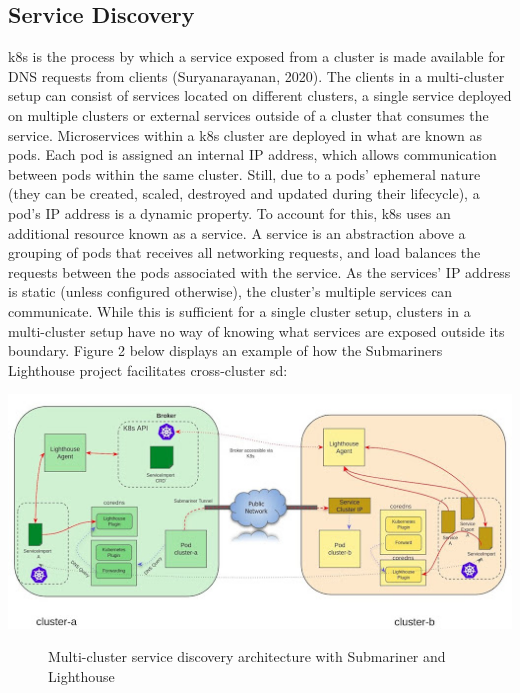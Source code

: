 \documentclass[12pt, a4paper, oneside]{article}
\begin{document}
\subsection{Service Discovery}
\acrshort{k8s} is the process by which a service exposed from a cluster is made available for DNS requests from clients (Suryanarayanan, 2020). The clients in a multi-cluster setup can consist of services located on different clusters, a single service deployed on multiple clusters or external services outside of a cluster that consumes the service. Microservices within a \acrshort{k8s} cluster are deployed in what are known as pods. Each pod is assigned an internal IP address, which allows communication between pods within the same cluster. Still, due to a pods’ ephemeral nature (they can be created, scaled, destroyed and updated during their lifecycle), a pod’s IP address is a dynamic property. To account for this, \acrshort{k8s} uses an additional resource known as a service. A service is an abstraction above a grouping of pods that receives all networking requests, and load balances the requests between the pods associated with the service. As the services’ IP address is static (unless configured otherwise), the cluster’s multiple services can communicate. While this is sufficient for a single cluster setup, clusters in a multi-cluster setup have no way of knowing what services are exposed outside its boundary. Figure 2 below displays an example of how the Submariners Lighthouse project facilitates cross-cluster \acrshort{sd}:

\begin{center}
	\includegraphics[scale=0.7]{images/service-discovery.jpg}
	\begin{figure}[hp]
		\caption[Multi-cluster service discovery architecture with Submariner and Lighthouse]{Multi-cluster service discovery architecture with Submariner and Lighthouse \citep{submariner}}
	\end{figure}
\end{center}
\end{document}
